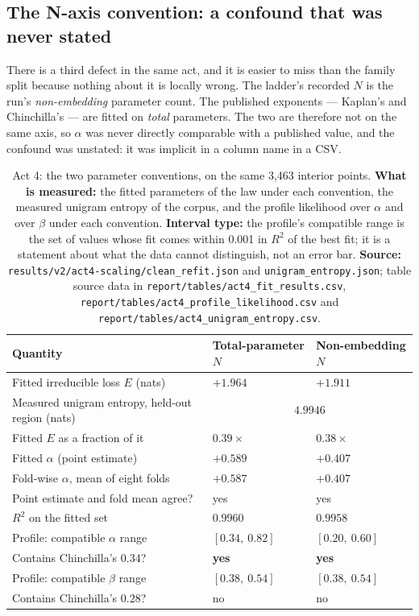 \documentclass[11pt,a4paper]{article}
\begin{document}
\subsection{The N-axis convention: a confound that was never stated}
\label{sec:act4-axis}

There is a third defect in the same act, and it is easier to miss than the
family split because nothing about it is locally wrong. The ladder's recorded
$N$ is the run's \emph{non-embedding} parameter count. The published exponents
--- Kaplan's and Chinchilla's --- are fitted on \emph{total} parameters. The
two are therefore not on the same axis, so $\alpha$ was never directly
comparable with a published value, and the confound was unstated: it was
implicit in a column name in a CSV. %

\begin{table}[H]
\centering
\begin{tabular}{L{5.2cm}R{4.2cm}R{4.2cm}}
\toprule
Quantity & Total-parameter $N$ & Non-embedding $N$ \\
\midrule
Fitted irreducible loss $E$ (nats) & $+1.964$ & $+1.911$ \\
Measured unigram entropy, held-out region (nats) &  \\
Fitted $E$ as a fraction of it & $0.39\times$ & $0.38\times$ \\
Fitted $\alpha$ (point estimate) & $+0.589$ & $+0.407$ \\
Fold-wise $\alpha$, mean of eight folds & $+0.587$ & $+0.407$ \\
Point estimate and fold mean agree? & yes & yes \\
$R^2$ on the fitted set & $0.9960$ & $0.9958$ \\
Profile: compatible $\alpha$ range & $[0.34,\ 0.82]$ & $[0.20,\ 0.60]$ \\
Contains Chinchilla's $0.34$? & \textbf{yes} & \textbf{yes} \\
Profile: compatible $\beta$ range & $[0.38,\ 0.54]$ & $[0.38,\ 0.54]$ \\
Contains Chinchilla's $0.28$? & no & no \\
\midrule
\end{tabular}
\caption{Act 4: the two parameter conventions, on the same 3,463 interior
points. \textbf{What is measured:} the fitted parameters of the law under
each convention, the measured unigram entropy of the corpus, and the profile
likelihood over $\alpha$ and over $\beta$ under each convention.
\textbf{Interval type:} the profile's compatible range is the set of values
whose fit comes within 0.001 in $R^2$ of the best fit; it is a statement
about what the data cannot distinguish, not an error bar. \textbf{Source:}
\texttt{results/v2/act4-scaling/clean\_refit.json} and
\texttt{unigram\_entropy.json}; table source data in
\texttt{report/tables/act4\_fit\_results.csv},
\texttt{report/tables/act4\_profile\_likelihood.csv} and
\texttt{report/tables/act4\_unigram\_entropy.csv}.}
\label{tab:act4-axis}
\end{table}
\end{document}
